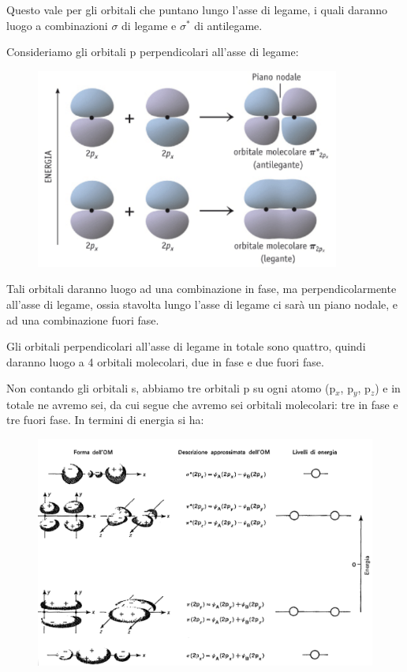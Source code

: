 Questo vale per gli orbitali che puntano lungo l'asse di legame, i quali daranno luogo a combinazioni $\sigma$ di legame e $\sigma^*$ di antilegame.

\vspace{0.2cm}Consideriamo gli orbitali p perpendicolari all'asse di legame:

\begin{figure}[htp]
    \centering
    \includegraphics[width=10cm]{immagini/orbitale_pigreco_p.png}
\end{figure}
Tali orbitali daranno luogo ad una combinazione in fase, ma perpendicolarmente all'asse di legame, ossia stavolta lungo l'asse di legame ci sarà un piano nodale, e ad una combinazione fuori fase.

Gli orbitali perpendicolari all'asse di legame in totale sono quattro, quindi daranno luogo a 4 orbitali molecolari, due in fase e due fuori fase.

Non contando gli orbitali s, abbiamo tre orbitali p su ogni atomo (p$_x$, p$_y$, p$_z$) e in totale ne avremo sei, da cui segue che avremo sei orbitali molecolari: tre in fase e tre fuori fase.
In termini di energia si ha:

\begin{figure}[htp]
    \centering
    \includegraphics[width=14cm]{immagini/equazioni_orbitali.png}
\end{figure}

